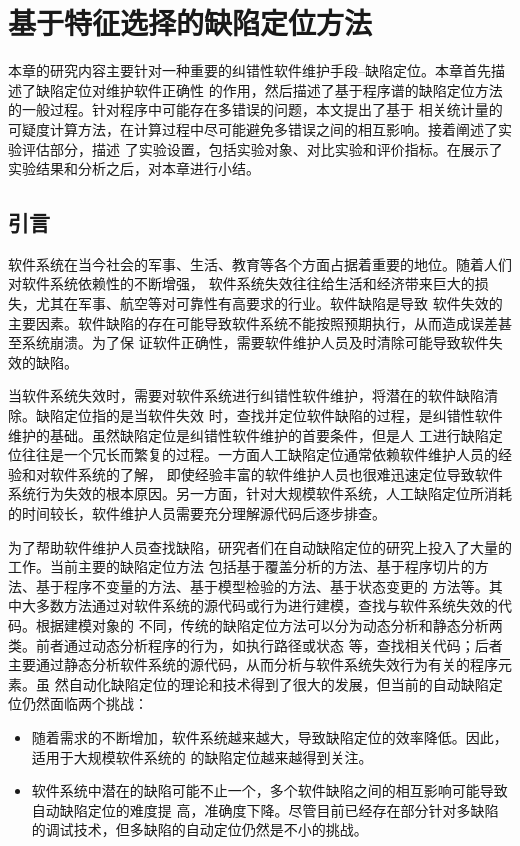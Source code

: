 
\chapter{基于特征选择的缺陷定位方法}
本章的研究内容主要针对一种重要的纠错性软件维护手段--缺陷定位。本章首先描述了缺陷定位对维护软件正确性
的作用，然后描述了基于程序谱的缺陷定位方法的一般过程。针对程序中可能存在多错误的问题，本文提出了基于
相关统计量的可疑度计算方法，在计算过程中尽可能避免多错误之间的相互影响。接着阐述了实验评估部分，描述
了实验设置，包括实验对象、对比实验和评价指标。在展示了实验结果和分析之后，对本章进行小结。

\section{引言}
软件系统在当今社会的军事、生活、教育等各个方面占据着重要的地位。随着人们对软件系统依赖性的不断增强，
软件系统失效往往给生活和经济带来巨大的损失，尤其在军事、航空等对可靠性有高要求的行业。软件缺陷是导致
软件失效的主要因素。软件缺陷的存在可能导致软件系统不能按照预期执行，从而造成误差甚至系统崩溃。为了保
证软件正确性，需要软件维护人员及时清除可能导致软件失效的缺陷。

当软件系统失效时，需要对软件系统进行纠错性软件维护，将潜在的软件缺陷清除。缺陷定位指的是当软件失效
时，查找并定位软件缺陷的过程，是纠错性软件维护的基础。虽然缺陷定位是纠错性软件维护的首要条件，但是人
工进行缺陷定位往往是一个冗长而繁复的过程。一方面人工缺陷定位通常依赖软件维护人员的经验和对软件系统的了解，
即使经验丰富的软件维护人员也很难迅速定位导致软件系统行为失效的根本原因。另一方面，针对大规模软件系统，人工缺陷定位所消耗的时间较长，软件维护人员需要充分理解源代码后逐步排查。

为了帮助软件维护人员查找缺陷，研究者们在自动缺陷定位的研究上投入了大量的工作。当前主要的缺陷定位方法
包括基于覆盖分析的方法、基于程序切片的方法、基于程序不变量的方法、基于模型检验的方法、基于状态变更的
方法等。其中大多数方法通过对软件系统的源代码或行为进行建模，查找与软件系统失效的代码。根据建模对象的
不同，传统的缺陷定位方法可以分为动态分析和静态分析两类。前者通过动态分析程序的行为，如执行路径或状态
等，查找相关代码；后者主要通过静态分析软件系统的源代码，从而分析与软件系统失效行为有关的程序元素。虽
然自动化缺陷定位的理论和技术得到了很大的发展，但当前的自动缺陷定位仍然面临两个挑战：

\begin{itemize}
      \item 随着需求的不断增加，软件系统越来越大，导致缺陷定位的效率降低。因此，适用于大规模软件系统的
   的缺陷定位越来越得到关注。
      \item 软件系统中潜在的缺陷可能不止一个，多个软件缺陷之间的相互影响可能导致自动缺陷定位的难度提
      高，准确度下降。尽管目前已经存在部分针对多缺陷的调试技术，但多缺陷的自动定位仍然是不小的挑战。
\end{itemize}

